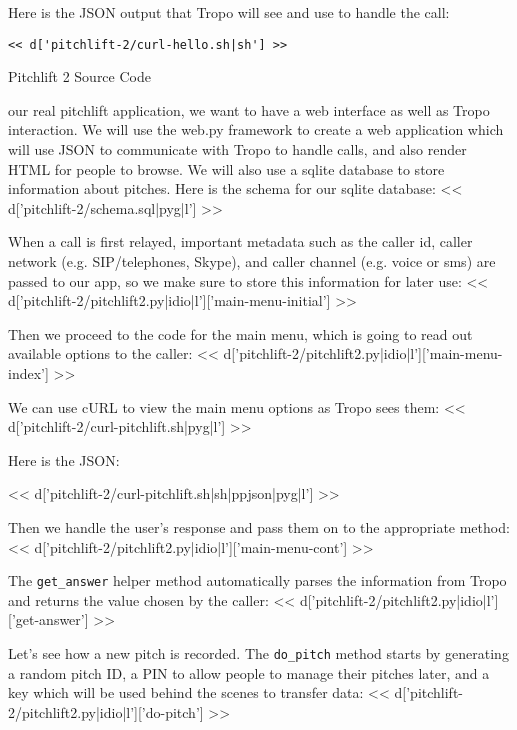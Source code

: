 \documentclass[custom, plainsections]{sciposter}
\begin{document}
\begin{multicols*}{2}
Here is the JSON output that Tropo will see and use to handle the call:

\begin{Verbatim}
<< d['pitchlift-2/curl-hello.sh|sh'] >>
\end{Verbatim}

\vspace{10pt}

\large
Pitchlift 2 Source Code
\small

\label{sec:pitchlift-2}

\vspace{5pt}

 our real pitchlift application, we want to have a web interface as well as Tropo interaction. We will use the web.py framework to create a web application which will use JSON to communicate with Tropo to handle calls, and also render HTML for people to browse. We will also use a sqlite database to store information about pitches. Here is the schema for our sqlite database:
<< d['pitchlift-2/schema.sql|pyg|l'] >>

When a call is first relayed, important metadata such as the caller id, caller network (e.g. SIP/telephones, Skype), and caller channel (e.g. voice or sms) are passed to our app, so we make sure to store this information for later use:
<< d['pitchlift-2/pitchlift2.py|idio|l']['main-menu-initial'] >>

Then we proceed to the code for the main menu, which is going to read out available options to the caller:
<< d['pitchlift-2/pitchlift2.py|idio|l']['main-menu-index'] >>

We can use cURL to view the main menu options as Tropo sees them:
<< d['pitchlift-2/curl-pitchlift.sh|pyg|l'] >>

Here is the JSON:

<< d['pitchlift-2/curl-pitchlift.sh|sh|ppjson|pyg|l'] >>

Then we handle the user's response and pass them on to the appropriate method:
<< d['pitchlift-2/pitchlift2.py|idio|l']['main-menu-cont'] >>

The \verb|get_answer| helper method automatically parses the information from Tropo and returns the value chosen by the caller:
<< d['pitchlift-2/pitchlift2.py|idio|l']['get-answer'] >>

Let's see how a new pitch is recorded. The \verb|do_pitch| method starts by generating a random pitch ID, a PIN to allow people to manage their pitches later, and a key which will be used behind the scenes to transfer data:
<< d['pitchlift-2/pitchlift2.py|idio|l']['do-pitch'] >>


\end{multicols*}
\end{document}

